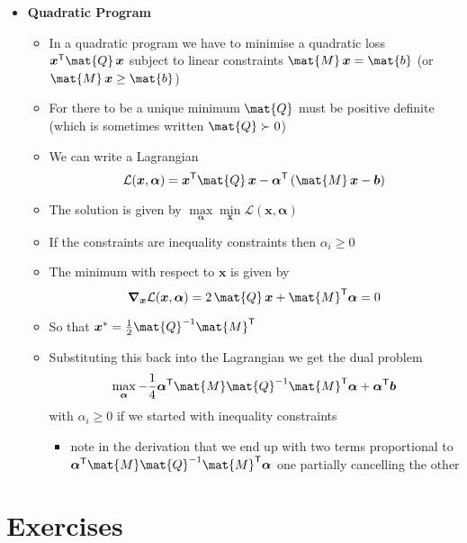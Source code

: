 \documentclass[11pt]{article}
\newcommand{\tr}{\textsf{T}}
\newcommand{\grad}{\bm{\nabla}}
\begin{document}
\begin{itemize}
\item \textbf{Quadratic Program}
\begin{itemize}
\item In a quadratic program we have to minimise a quadratic loss
\(\bm{x}^\tr \mat{Q}\,\bm{x}\) subject to linear constraints
\(\mat{M}\,\bm{x} =\mat{b}\) (or \(\mat{M}\,\bm{x} \geq \mat{b}\))
\item For there to be a unique minimum \(\mat{Q}\) must be positive
definite (which is sometimes written \(\mat{Q}\succ0\))
\item We can write a Lagrangian
$$ \mathcal{L}(\bm{x},\bm{\alpha}) = \bm{x}^\tr \mat{Q}\, \bm{x} -
      \bm{\alpha}^\tr \left( \mat{M}\,\bm{x} - \bm{b}\right) $$
\item The solution is given by  \(\max\limits_{\bm{\alpha}}
        \min\limits_{\bm{x}}  \mathcal{L}(\bm{x},\bm{\alpha})\)
\item If the constraints are inequality constraints then \(\alpha_i\geq0\)
\item The minimum with respect to \(\bm{x}\) is given by 
$$ \grad_{\bm{x}} \mathcal{L}(\bm{x},\bm{\alpha}) =  2\, \mat{Q}\,
        \bm{x} + \mat{M}^\tr \bm{\alpha} = 0 $$
\item So that \(\bm{x}^* = \frac{1}{2} \mat{Q}^{-1} \mat{M}^\tr\)
\item Substituting this back into the Lagrangian we get the dual problem
 $$ \max_{\bm{\alpha}}
      -\frac{1}{4} \bm{\alpha}^\tr \mat{M} \mat{Q}^{-1} \mat{M}^\tr
      \bm{\alpha} + \bm{\alpha}^\tr \bm{b} $$
with \(\alpha_i\geq0\) if we started with inequality constraints
\begin{itemize}
\item note in the derivation that we end up with two terms
proportional to \(\bm{\alpha}^\tr \mat{M} \mat{Q}^{-1} \mat{M}^\tr
          \bm{\alpha}\) one partially cancelling the other
\end{itemize}
\end{itemize}
\end{itemize}



\section{Exercises}
\label{sec:orga75f437}
\end{document}
